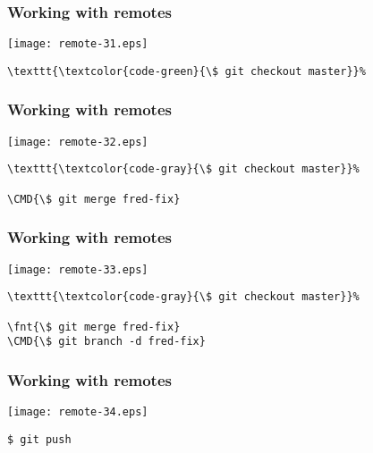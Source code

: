 \documentclass[english]{beamer}
\newcommand{\CMD}[1]{%
\texttt{\textcolor{code-green}{#1}}%
}
\newcommand{\fnt}[1]{%
\texttt{\textcolor{code-gray}{#1}}%
}
\begin{document}
\begin{frame}[fragile]
\frametitle{Working with remotes}

\texttt{[image: remote-31.eps]}

\begin{Verbatim}[commandchars=\\\{\}]
\CMD{\$ git checkout master}
\end{Verbatim}

\vspace{\textheight}
\end{frame}

\begin{frame}[fragile]
\frametitle{Working with remotes}

\texttt{[image: remote-32.eps]}

\begin{Verbatim}[commandchars=\\\{\}]
\fnt{\$ git checkout master}
\CMD{\$ git merge fred-fix}
\end{Verbatim}

\vspace{\textheight}
\end{frame}

\begin{frame}[fragile]
\frametitle{Working with remotes}

\texttt{[image: remote-33.eps]}

\begin{Verbatim}[commandchars=\\\{\}]
\fnt{\$ git checkout master}
\fnt{\$ git merge fred-fix}
\CMD{\$ git branch -d fred-fix}
\end{Verbatim}

\vspace{\textheight}
\end{frame}

\begin{frame}[fragile]
\frametitle{Working with remotes}

\texttt{[image: remote-34.eps]}

\begin{center}
\CMD{\$ git push}
\end{center}

\vspace{\textheight}
\end{frame}
\end{document}
